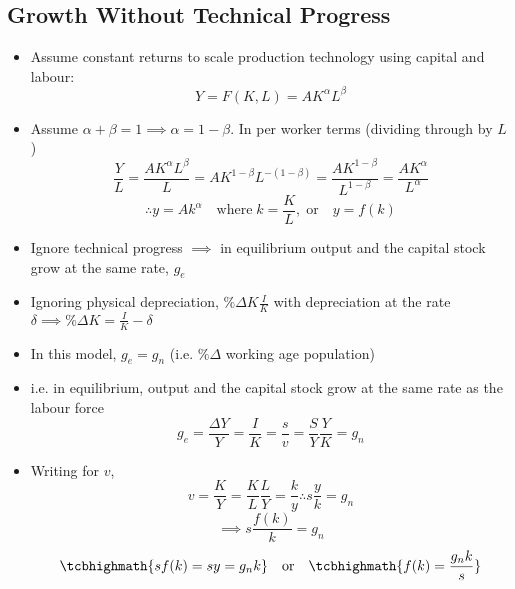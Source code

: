 \documentclass{article}
\begin{document}
\subsection{Growth Without Technical Progress}
	\begin{itemize}
		\item Assume constant returns to scale production technology using capital and labour:
		\begin{equation}
			Y = F(K,L) = AK^\alpha L^\beta \label{eq:3.1}
		\end{equation}
		\item Assume \( \alpha + \beta = 1 \implies \alpha = 1 - \beta \). In per worker terms (dividing through by \( L \))
		\begin{equation}
			\frac{Y}{L} = \frac{AK^\alpha L^\beta}{L} = AK^{1-\beta} L^{-(1-\beta)} = \frac{AK^{1-\beta}}{L^{1-\beta}} = \frac{AK^\alpha}{L^\alpha} \label{eq:3.2}
		\end{equation}
		\begin{equation}
			\therefore y = Ak^\alpha \quad\text{where}\; k=\frac{K}{L},\;\text{or}\quad y=f(k) \label{eq:3.3}
		\end{equation}
		\item Ignore technical progress \( \implies \) in equilibrium output and the capital stock grow at the same rate, \( g_e \)
		\item Ignoring physical depreciation, \( \%\Delta K \frac{I}{K} \) with depreciation at the rate \( \delta \implies \% \Delta K = \frac{I}{K} -\delta \)
		\item In this model, \( g_e = g_n \) (i.e. \( \%\Delta \) working age population)
		\item i.e. in equilibrium, output and the capital stock grow at the same rate as the labour force
		\begin{equation}
			g_e = \frac{\Delta Y}{Y} = \frac{I}{K} = \frac{s}{v} = \frac{S}{Y} \frac{Y}{K} = g_n \label{eq:3.4}
		\end{equation}
		\item Writing for \( v \),
		\begin{equation}
			v = \frac{K}{Y} = \frac{K}{L}\frac{L}{Y} = \frac{k}{y} \therefore s \frac{y}{k} = g_n \label{eq:3.5}
		\end{equation}
		\begin{equation}
			\implies s \frac{f(k)}{k} = g_n \label{eq:3.6}
		\end{equation}
		\begin{equation}
			\tcbhighmath{sf(k) = sy = g_n k} \quad\text{or}\quad \tcbhighmath{f(k) = \frac{g_n k}{s}} \label{eq:3.7}

\end{equation}
\end{itemize}
\end{document}

